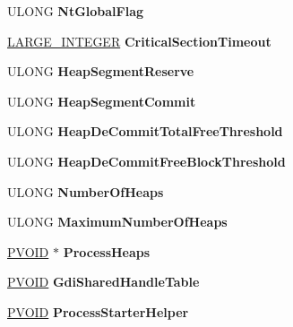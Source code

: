 \begin{DoxyCompactItemize}
\mbox{\label{struct___p_e_b_ac6c6e6e73d4ab0105f6617ea621ade2e}} 
U\+L\+O\+NG {\bfseries Nt\+Global\+Flag}
\item 
\mbox{\label{struct___p_e_b_a7dc31e3e3f2fe8594e6ef7d4029f679a}} 
\hyperlink{union___l_a_r_g_e___i_n_t_e_g_e_r}{L\+A\+R\+G\+E\+\_\+\+I\+N\+T\+E\+G\+ER} {\bfseries Critical\+Section\+Timeout}
\item 
\mbox{\label{struct___p_e_b_a74c698c7ca3b1fe2330b0f4523f3db15}} 
U\+L\+O\+NG {\bfseries Heap\+Segment\+Reserve}
\item 
\mbox{\label{struct___p_e_b_ac4879bab23b9ba0d1d441e6a9e1f7aca}} 
U\+L\+O\+NG {\bfseries Heap\+Segment\+Commit}
\item 
\mbox{\label{struct___p_e_b_abdf9e6043ed512dd74cd6db458304104}} 
U\+L\+O\+NG {\bfseries Heap\+De\+Commit\+Total\+Free\+Threshold}
\item 
\mbox{\label{struct___p_e_b_a952d08626b262e42ae5227f9a47c1869}} 
U\+L\+O\+NG {\bfseries Heap\+De\+Commit\+Free\+Block\+Threshold}
\item 
\mbox{\label{struct___p_e_b_aa91f5b1a771afcc566e2ea74d020c590}} 
U\+L\+O\+NG {\bfseries Number\+Of\+Heaps}
\item 
\mbox{\label{struct___p_e_b_a88e48783803789f405a8dfc113e79df8}} 
U\+L\+O\+NG {\bfseries Maximum\+Number\+Of\+Heaps}
\item 
\mbox{\label{struct___p_e_b_a9cd8b55fb7e262e750c20ac3cc862a76}} 
\hyperlink{interfacevoid}{P\+V\+O\+ID} $\ast$ {\bfseries Process\+Heaps}
\item 
\mbox{\label{struct___p_e_b_a87bcf6d7b7ab12df63fc9b306c52127c}} 
\hyperlink{interfacevoid}{P\+V\+O\+ID} {\bfseries Gdi\+Shared\+Handle\+Table}
\item 
\mbox{\label{struct___p_e_b_a2c39b11771e0b79d63b577601e899049}} 
\hyperlink{interfacevoid}{P\+V\+O\+ID} {\bfseries Process\+Starter\+Helper}
\item 

\end{DoxyCompactItemize}
